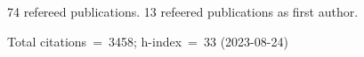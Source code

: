 74 refereed publications. 13 refeered publications as first author.

Total citations~=~3458; h-index~=~33 (2023-08-24)